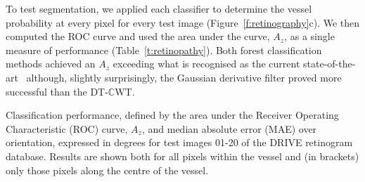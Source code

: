 \documentclass[runningheads,a4paper]{llncs}
\newcommand{\fref}[1]{Figure~\ref{#1}}
\newcommand{\tref}[1]{Table~\ref{#1}}
\def\dtcwt{DT-$\mathbb{C}$WT}
\begin{document}
To test segmentation, we applied each classifier to determine the vessel probability at every pixel for every test image (\fref{f:retinography}c). We then computed the ROC curve and used the area under the curve, $A_z$, as a single measure of performance (\tref{t:retinopathy}). Both forest classification methods achieved an $A_z$ exceeding what is recognised as the current state-of-the-art~\cite{Staal_etal_TMI04} although, slightly surprisingly, the Gaussian derivative filter proved more successful than the \dtcwt{}.
%
\begin{table}[tb]
\centering

%
\caption{Classification performance, defined by the area under the Receiver Operating Characteristic (ROC) curve, $A_z$, and median absolute error (MAE) over orientation, expressed in degrees for test images 01-20 of the DRIVE retinogram database. Results are shown both for all pixels within the vessel and (in brackets) only those pixels along the centre of the vessel.}
\label{t:retinopathy}
\end{table}
%
\end{document}
